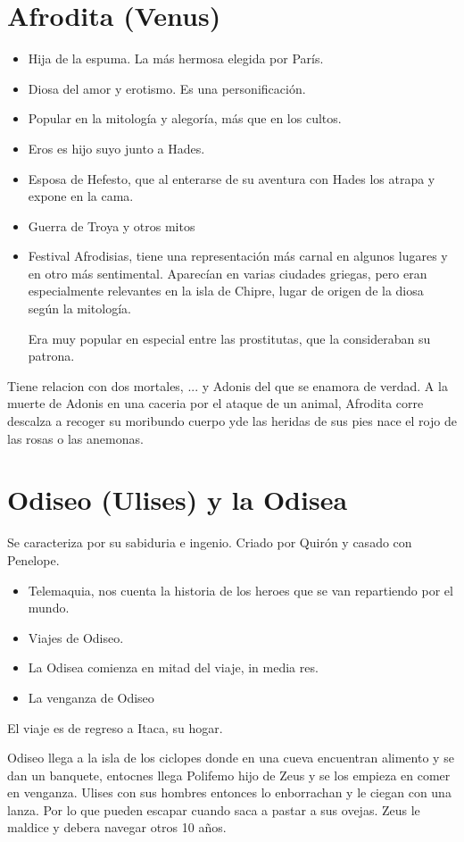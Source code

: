 \section{Afrodita (Venus)}
\begin{itemize}
    \item Hija de la espuma. La más hermosa elegida por París.
    \item Diosa del amor y erotismo. Es una personificación.
    \item Popular en la mitología y alegoría, más que en los cultos.
    \item Eros es hijo suyo junto a Hades.
    \item Esposa de Hefesto, que al enterarse de su aventura con Hades los atrapa y expone en la cama.
    \item Guerra de Troya y otros mitos
    \item Festival Afrodisias, tiene una representación más carnal en algunos lugares y en otro más sentimental. Aparecían en varias ciudades griegas, pero eran especialmente relevantes en la isla de Chipre, lugar de origen de la diosa según la mitología. 
    
    Era muy popular en especial entre las prostitutas, que la consideraban su patrona.
\end{itemize}

Tiene relacion con dos mortales, ...  y Adonis del que se enamora de verdad. A la muerte de Adonis en una caceria por el ataque de un animal, Afrodita corre descalza a recoger su moribundo cuerpo yde las heridas de sus pies nace el rojo de las rosas o las anemonas.

\section{Odiseo (Ulises) y la Odisea}
Se caracteriza por su sabiduria e ingenio. Criado por Quirón y casado con Penelope.
\begin{itemize}
    \item Telemaquia, nos cuenta la historia de los heroes que se van repartiendo por el mundo.
    \item Viajes de Odiseo.
    \item La Odisea comienza en mitad del viaje, in media res.
    \item La venganza de Odiseo
\end{itemize}

El viaje es de regreso a Itaca, su hogar.

Odiseo llega a la isla de los ciclopes donde en una cueva encuentran alimento y se dan un banquete, entocnes llega Polifemo hijo de Zeus y se los empieza en comer en venganza. Ulises con sus hombres entonces lo enborrachan y le ciegan con una lanza. Por lo que pueden escapar cuando saca a pastar a sus ovejas. Zeus le maldice y debera navegar otros 10 años.

